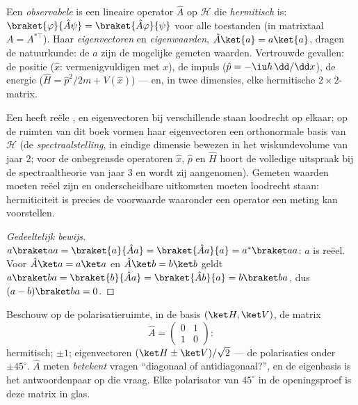 \begin{definition}[Observabelen]\label{def:b3:quantum-formalism:observable}
Een \emph{observabele} is een lineaire operator $\hat A$ op $\mathcal H$
die \emph{hermitisch} is: $\braket{\varphi}{\hat A\psi} =
\braket{\hat A\varphi}{\psi}$ voor alle toestanden (in matrixtaal $A = A^{*\top}$).
Haar \emph{eigenvectoren} en \emph{eigenwaarden}, $\hat A\ket{a} = a\ket{a}$, dragen de natuurkunde: de $a$ zijn de mogelijke gemeten
waarden. Vertrouwde gevallen: de positie ($\hat x$: vermenigvuldigen met
$x$), de impuls ($\hat p = -\iu\hbar\,\dd/\dd x$), de energie ($\hat H = \hat p^2/2m + V(\hat x)$) --- en, in twee dimensies, elke hermitische
$2\times2$-matrix.
\end{definition}

\begin{theorem}\label{thm:b3:quantum-formalism:hermitian}
Een  heeft reële , en eigenvectoren bij
verschillende  staan loodrecht op elkaar; op de ruimten van
dit boek vormen haar eigenvectoren een orthonormale basis van $\mathcal H$
(de \emph{spectraalstelling}, in eindige dimensie bewezen in het
wiskundevolume van jaar 2; voor de onbegrensde operatoren $\hat x$, $\hat p$ en $\hat H$ hoort de volledige uitspraak bij de spectraaltheorie van
jaar 3 en wordt zij aangenomen). Gemeten waarden moeten reëel zijn en
onderscheidbare uitkomsten moeten loodrecht staan: hermiticiteit is precies
de voorwaarde waaronder een operator een meting kan voorstellen.
\end{theorem}

\begin{proof}[Gedeeltelijk bewijs]
$a\braket aa = \braket{a}{\hat Aa} = \braket{\hat Aa}{a} =
a^*\braket aa$: $a$ is reëel. Voor $\hat A\ket a = a\ket a$ en $\hat A\ket b
= b\ket b$ geldt $a\braket ba = \braket{b}{\hat Aa} = \braket{\hat
Ab}{a} = b\braket ba$, dus $(a - b)\braket ba = 0$.
\end{proof}

\begin{example}\label{ex:b3:quantum-formalism:twolevel}
Beschouw op de polarisatieruimte, in de basis $(\ket H, \ket V)$, de
matrix
\[
\hat A = \begin{pmatrix} 0 & 1\\ 1 & 0\end{pmatrix} :
\]
hermitisch;  $\pm1$; eigenvectoren $(\ket H \pm
\ket V)/\sqrt2$ --- de polarisaties onder $\pm45^\circ$. $\hat A$ meten
\emph{betekent} vragen ``diagonaal of antidiagonaal?'', en de eigenbasis
is het antwoordenpaar op die vraag. Elke polarisator van $45^\circ$ in de
openingsproef is deze matrix in glas.
\end{example}

